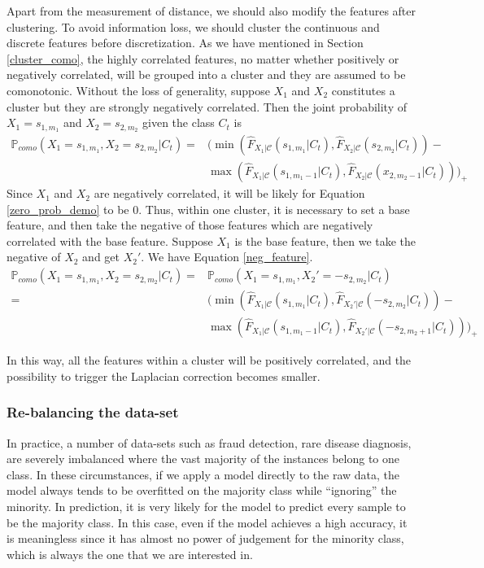 \documentclass[twoside,11pt]{article}
\begin{document}
Apart from the measurement of distance, we should also modify the features after clustering. To avoid information loss, we should cluster the continuous and discrete features before discretization. As we have mentioned in Section \ref{cluster_como}, the highly correlated features, no matter whether positively or negatively correlated, will be grouped into a cluster and they are assumed to be comonotonic. Without the loss of generality, suppose $X_1$ and $X_2$ constitutes a cluster but they are strongly negatively correlated. Then the joint probability of $X_1=s_{1,m_1}$ and $X_2=s_{2,m_2}$ given the class $C_t$ is 
\begin{equation}\label{zero_prob_demo}
\begin{aligned}
    \mathbb{P}_{como}(X_1=s_{1,m_1},X_2=s_{2,m_2}|C_t) =&
    (\min(\hat{F}_{X_1|\mathcal{C}}(s_{1,m_1}|C_t),\hat{F}_{X_2|\mathcal{C}}(s_{2,m_2}|C_t))-\\
    &\max(\hat{F}_{X_1|\mathcal{C}}(s_{1,m_1-1}|C_t),\hat{F}_{X_2|\mathcal{C}}(x_{2,m_2-1}|C_t)))_+
\end{aligned}
\end{equation}
Since $X_1$ and $X_2$ are negatively correlated, it will be likely for Equation \ref{zero_prob_demo} to be $0$. Thus, within one cluster, it is necessary to set a base feature, and then take the negative of those features which are negatively correlated with the base feature. Suppose $X_1$ is the base feature, then we take the negative of $X_2$ and get $X_2'$. We have Equation \ref{neg_feature}.
\begin{equation}\label{neg_feature}
\begin{aligned}
    \mathbb{P}_{como}(X_1=s_{1,m_1},X_2=s_{2,m_2}|C_t) =&
    \mathbb{P}_{como}(X_1=s_{1,m_1},X_2'=-s_{2,m_2}|C_t) \\
    =&(\min(\hat{F}_{X_1|\mathcal{C}}(s_{1,m_1}|C_t),\hat{F}_{X_2'|\mathcal{C}}(-s_{2,m_2}|C_t))-\\
    &\max(\hat{F}_{X_1|\mathcal{C}}(s_{1,m_1-1}|C_t),\hat{F}_{X_2'|\mathcal{C}}(-s_{2,m_2+1}|C_t)))_+
\end{aligned}
\end{equation}

In this way, all the features within a cluster will be positively correlated, and the possibility to trigger the Laplacian correction becomes smaller.

\subsubsection{Re-balancing the data-set}
In practice, a number of data-sets such as fraud detection, rare disease diagnosis, are severely imbalanced where the vast majority of the instances belong to one class. In these circumstances, if we apply a model directly to the raw data, the model always tends to be overfitted on the majority class while ``ignoring'' the minority. In prediction, it is very likely for the model to predict every sample to be the majority class. In this case, even if the model achieves a high accuracy, it is meaningless since it has almost no power of judgement for the minority class, which is always the one that we are interested in. 
\end{document}
